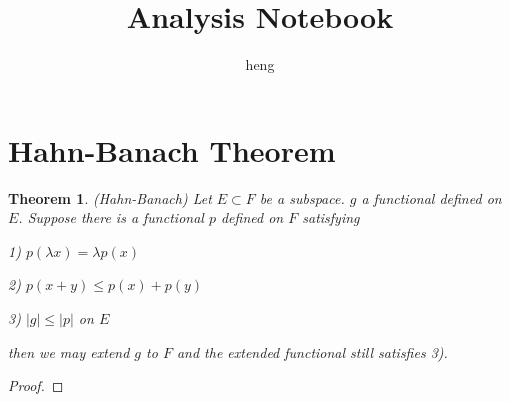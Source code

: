 \documentclass{article}
\newtheorem{theorem}{Theorem}
\begin{document}
\title{Analysis Notebook}
\author{heng}
\maketitle

\tableofcontents




\section{Hahn-Banach Theorem}

\begin{theorem}{(Hahn-Banach)}
	Let $E\subset F$ be a subspace. $g$ a functional defined on $E$. Suppose there is a functional $p$ defined on $F$ satisfying 
	
	1) $p(\lambda x)=\lambda p(x)$
	
	2) $p(x+y)\leq p(x)+p(y)$
	
	3) $|g|\leq |p|$ on $E$
	
	then we may extend $g$ to $F$ and the extended functional still satisfies 3).
\end{theorem}

\begin{proof}
	
\end{proof}
\end{document}
